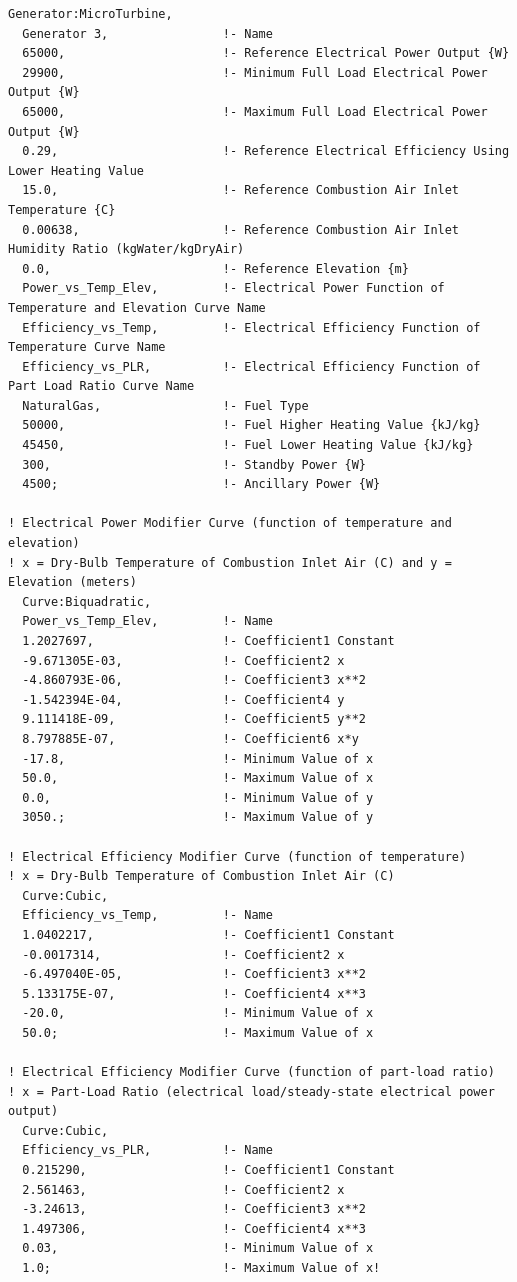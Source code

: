 \begin{lstlisting}
Generator:MicroTurbine,
  Generator 3,                !- Name
  65000,                      !- Reference Electrical Power Output {W}
  29900,                      !- Minimum Full Load Electrical Power Output {W}
  65000,                      !- Maximum Full Load Electrical Power Output {W}
  0.29,                       !- Reference Electrical Efficiency Using Lower Heating Value
  15.0,                       !- Reference Combustion Air Inlet Temperature {C}
  0.00638,                    !- Reference Combustion Air Inlet Humidity Ratio (kgWater/kgDryAir)
  0.0,                        !- Reference Elevation {m}
  Power_vs_Temp_Elev,         !- Electrical Power Function of Temperature and Elevation Curve Name
  Efficiency_vs_Temp,         !- Electrical Efficiency Function of Temperature Curve Name
  Efficiency_vs_PLR,          !- Electrical Efficiency Function of Part Load Ratio Curve Name
  NaturalGas,                 !- Fuel Type
  50000,                      !- Fuel Higher Heating Value {kJ/kg}
  45450,                      !- Fuel Lower Heating Value {kJ/kg}
  300,                        !- Standby Power {W}
  4500;                       !- Ancillary Power {W}

! Electrical Power Modifier Curve (function of temperature and elevation)
! x = Dry-Bulb Temperature of Combustion Inlet Air (C) and y = Elevation (meters)
  Curve:Biquadratic,
  Power_vs_Temp_Elev,         !- Name
  1.2027697,                  !- Coefficient1 Constant
  -9.671305E-03,              !- Coefficient2 x
  -4.860793E-06,              !- Coefficient3 x**2
  -1.542394E-04,              !- Coefficient4 y
  9.111418E-09,               !- Coefficient5 y**2
  8.797885E-07,               !- Coefficient6 x*y
  -17.8,                      !- Minimum Value of x
  50.0,                       !- Maximum Value of x
  0.0,                        !- Minimum Value of y
  3050.;                      !- Maximum Value of y

! Electrical Efficiency Modifier Curve (function of temperature)
! x = Dry-Bulb Temperature of Combustion Inlet Air (C)
  Curve:Cubic,
  Efficiency_vs_Temp,         !- Name
  1.0402217,                  !- Coefficient1 Constant
  -0.0017314,                 !- Coefficient2 x
  -6.497040E-05,              !- Coefficient3 x**2
  5.133175E-07,               !- Coefficient4 x**3
  -20.0,                      !- Minimum Value of x
  50.0;                       !- Maximum Value of x

! Electrical Efficiency Modifier Curve (function of part-load ratio)
! x = Part-Load Ratio (electrical load/steady-state electrical power output)
  Curve:Cubic,
  Efficiency_vs_PLR,          !- Name
  0.215290,                   !- Coefficient1 Constant
  2.561463,                   !- Coefficient2 x
  -3.24613,                   !- Coefficient3 x**2
  1.497306,                   !- Coefficient4 x**3
  0.03,                       !- Minimum Value of x
  1.0;                        !- Maximum Value of x!


\end{lstlisting}
